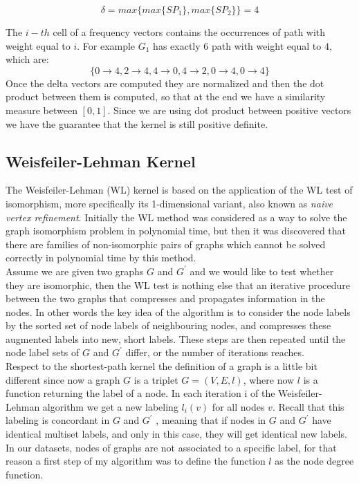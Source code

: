 \documentclass[11pt,a4paper]{article}
\begin{document}
$$\delta = max\Big\{ max\big\{ SP_1\big\}, max\big\{ SP_2\big\}\Big\} = 4$$

The $i-th$ cell of a frequency vectors contains the occurrences of path with weight equal to $i$. For example $G_1$ has exactly $6$ path with weight equal to $4$, which are: $$\Big\{  0 \rightarrow 4, 2 \rightarrow 4, 4 \rightarrow 0, 4 \rightarrow 2, 0 \rightarrow 4, 0 \rightarrow 4 \Big\}$$
Once the delta vectors are computed they are normalized and then the dot product between them is computed, so that at the end we have a similarity measure between $[0,1]$. Since we are using dot product between positive vectors we have the guarantee that the kernel is still positive definite.

\subsection{Weisfeiler-Lehman Kernel}
The Weisfeiler-Lehman (WL) kernel is based on the application of the WL test of isomorphism, more specifically its 1-dimensional variant, also known as \textit{naive vertex refinement}. Initially the WL method was considered as a way to solve the graph isomorphism problem in polynomial time, but then it was discovered that there are families of non-isomorphic pairs of graphs which cannot be solved correctly in polynomial time by this method.\\
Assume we are given two graphs $G$ and $G^\prime $ and we would like to test whether they are isomorphic, then the WL test is nothing else that an iterative procedure between the two graphs that compresses and propagates information in the nodes. In other words the key idea of the algorithm is to consider the node labels by the sorted set of node labels of neighbouring nodes, and compresses these augmented labels into new, short labels. These steps are then repeated until the node label sets of $G$ and $G^\prime$ differ, or the number of iterations reaches. \\
Respect to the shortest-path kernel the definition of a graph is a little bit different since now a graph $G$ is a triplet $G = (V, E, l)$, where now $l$ is a function returning the label of a node. 
In each iteration i of the Weisfeiler-Lehman algorithm  we get a new labeling $l_i(v)$ for all nodes $v$. Recall that this labeling is concordant in $G$ and $G^\prime$ , meaning that if nodes in $G$ and $G^\prime$ have identical multiset labels, and only in this case, they will get identical new labels.
In our datasets, nodes of graphs are not associated to a specific label, for that reason a first step of my algorithm was to define the function $l$ as the node degree function.\\
\end{document}
